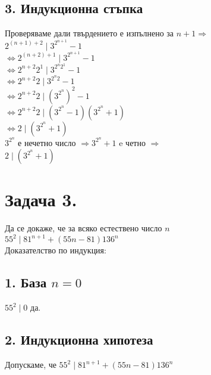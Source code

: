 \documentclass[12pt]{article}
\begin{document}
\subsection*{3. Индукционна стъпка}
Проверяваме дали твърдението е изпълнено за $n+1 \Rightarrow$\\
$2^{(n + 1) + 2} \mid 3^{2^{n + 1}} - 1$\\
$\Leftrightarrow 2^{(n + 2) + 1} \mid 3^{2^{n + 1}} - 1$\\
$\Leftrightarrow 2^{n + 2}2^1 \mid 3^{2^n2^1} - 1$\\
$\Leftrightarrow 2^{n + 2}2 \mid 3^{2^n2} - 1$\\
$\Leftrightarrow 2^{n + 2}2 \mid (3^{2^n})^2 - 1$\\
$\Leftrightarrow 2^{n + 2}2 \mid (3^{2^n} - 1)(3^{2^n} + 1)$\\
$\Leftrightarrow 2 \mid (3^{2^n} + 1)$\\
$3^{2^n}$ е нечетно число $\Rightarrow 3^{2^n} + 1$ e четно $\Rightarrow$\\
$2 \mid (3^{2^n} + 1)$

\section*{Задача 3.}
Да се докаже, че за всяко естествено число $n$\\
$55^2 \mid 81^{n+1} + (55n -81)136^n$\\
Доказателство по индукция:\\
\subsection*{1. База $n = 0$}
$55^2 \mid 0$ да.
\subsection*{2. Индукционна хипотеза}
Допускаме, че $55^2 \mid 81^{n+1} + (55n -81)136^n$
\end{document}
